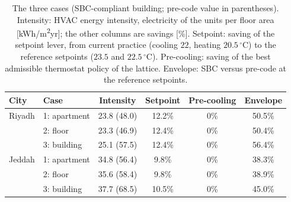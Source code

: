 \documentclass[10pt,a4paper,twocolumn]{article}
\theoremstyle{definition}
\begin{document}
\begin{table}[!b]
\centering
\caption{The three cases (SBC-compliant building; pre-code value in parentheses). Intensity: HVAC energy intensity, electricity of the units per floor area [kWh/m\textsuperscript{2}yr]; the other columns are savings [\%]. Setpoint: saving of the setpoint lever, from current practice (cooling $22$, heating $20.5\,^{\circ}$C) to the reference setpoints ($23.5$ and $22.5\,^{\circ}$C). Pre-cooling: saving of the best admissible thermostat policy of the lattice. Envelope: SBC versus pre-code at the reference setpoints.}
\label{tab:scopes}
\footnotesize\setlength{\tabcolsep}{3pt}
\begin{tabularx}{\linewidth}{@{}l l C C C C@{}}
\toprule
City & Case & Intensity & Setpoint & Pre-cooling & Envelope \\
\midrule
Riyadh & 1: apartment & 23.8 (48.0) & 12.2\% & 0\% & 50.5\% \\
       & 2: floor & 23.3 (46.9) & 12.4\% & 0\% & 50.4\% \\
       & 3: building & 25.1 (57.5) & 12.4\% & 0\% & 56.4\% \\
\midrule
Jeddah & 1: apartment & 34.8 (56.4) & 9.8\% & 0\% & 38.3\% \\
       & 2: floor & 35.6 (58.4) & 9.8\% & 0\% & 38.9\% \\
       & 3: building & 37.7 (68.5) & 10.5\% & 0\% & 45.0\% \\
\bottomrule
\end{tabularx}
\end{table}
\end{document}
